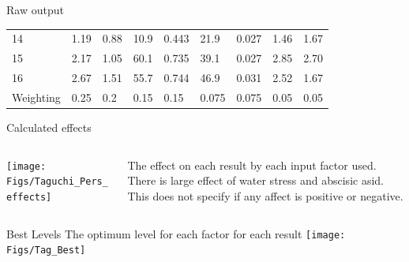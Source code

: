 \documentclass[10pt]{beamer}
\begin{document}
\begin{frame}{Raw output}
\begin{table}[htpb]
\begin{tabular}{p{1.2cm} |  p{1cm}   p{0.5cm}  p{0.8cm}   p{0.8cm}  p{1cm}   p{0.8cm}  p{0.8cm}   p{0.8cm}}
14   &    1.19   &     0.88   &    	10.9   &    	0.443   &    	21.9   &    	0.027   &    	1.46   &    	1.67\\
15   &    2.17   &     1.05   &    	60.1   &    	0.735   &    	39.1   &    	0.027   &    	2.85   &    	2.70\\
16   &    2.67   &     1.51   &    	55.7   &    	0.744   &    	46.9   &   	0.031   &    	2.52   &    	1.67\\
\color{lightgray} Weighting & \color{lightgray} 0.25  & \color{lightgray} 0.2 & 	\color{lightgray} 0.15 & 	\color{lightgray} 0.15  & 	\color{lightgray} 0.075 & 	\color{lightgray} 0.075 &  	\color{lightgray} 0.05 & 	\color{lightgray} 0.05\\ 
\hline
\end{tabular}
\end{table}
\end{frame}



\begin{frame}{Calculated effects}
  \begin{columns}[T]
    \begin{column}{8cm}
	\texttt{[image: Figs/Taguchi\_Pers\_effects]}
    \end{column}
    \begin{column}{4cm}
	\vspace*{1.8cm}
	The effect on each result by each input factor used. There is large effect of water stress and abscisic asid.\\ \vspace{5mm}
	This does not specify if any affect is positive or negative. 
    \end{column}
  \end{columns}
\end{frame}


\begin{frame}{Best Levels}
	The optimum level for each factor for each result
	\texttt{[image: Figs/Tag\_Best]}
\end{frame}
\end{document}
